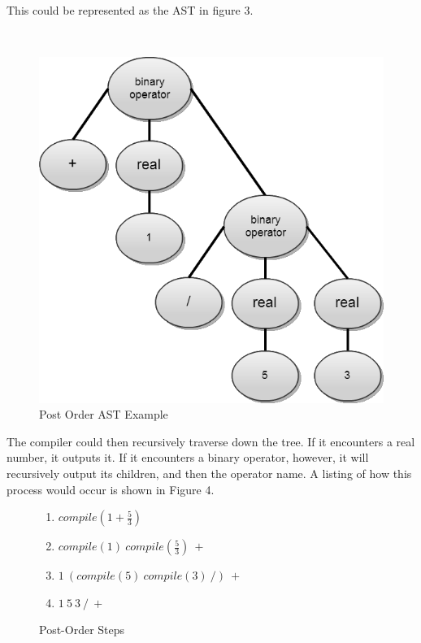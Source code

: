 \documentclass[titlepage]{article}
\begin{document}
			This could be represented as the AST in figure 3.
			\newline

			\begin{figure}
				\caption{Post Order AST Example}
				~\centerline{\includegraphics[scale=.5]{ExampleCompileBinaryAST.png}}
			\end{figure}

			The compiler could then recursively traverse down the tree.  If it encounters a real number, it outputs it.  If it encounters a binary operator, however, it will recursively output its children, and then the operator name.  A listing of how this process would occur is shown in Figure 4.
			\newline

			\begin{figure}
				\caption{Post-Order Steps}
				\begin{enumerate}
					\itemsep0em
					\item $compile(1 + \frac{5}{3})$
					\item $compile(1)\ compile(\frac{5}{3})\ +$
					\item $1\ (compile(5)\ compile(3)\ /)\ +$
					\item $1\ 5\ 3\ /\ +$
					\newline
				\end{enumerate}
			\end{figure}
\end{document}
